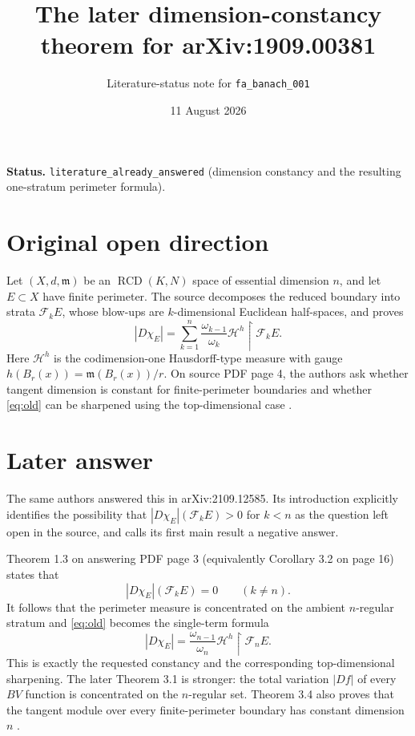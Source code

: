 \documentclass[11pt]{article}
\title{The later dimension-constancy theorem for arXiv:1909.00381}
\author{Literature-status note for \texttt{fa\_banach\_001}}
\date{11 August 2026}
\begin{document}
\maketitle

\noindent\textbf{Status.}
\texttt{literature\_already\_answered} (dimension constancy and the resulting
one-stratum perimeter formula).

\section*{Original open direction}

Let $(X,d,\mathfrak m)$ be an $\operatorname{RCD}(K,N)$ space of essential
dimension $n$, and let $E\subset X$ have finite perimeter.  The source
decomposes the reduced boundary into strata $\mathcal F_kE$, whose blow-ups
are $k$-dimensional Euclidean half-spaces, and proves
\begin{equation}\label{eq:old}
 |D\chi_E|=\sum_{k=1}^{n}\frac{\omega_{k-1}}{\omega_k}
  \mathcal H^h\!\restriction\mathcal F_kE.
\end{equation}
Here $\mathcal H^h$ is the codimension-one Hausdorff-type measure with gauge
$h(B_r(x))=\mathfrak m(B_r(x))/r$.  On source PDF page 4, the authors ask
whether tangent dimension is constant for finite-perimeter boundaries and
whether \eqref{eq:old} can be sharpened using the top-dimensional case
\cite{BPS19}.

\section*{Later answer}

The same authors answered this in arXiv:2109.12585.  Its introduction
explicitly identifies the possibility that
$|D\chi_E|(\mathcal F_kE)>0$ for $k<n$ as the question left open in the
source, and calls its first main result a negative answer.

Theorem 1.3 on answering PDF page 3 (equivalently Corollary 3.2 on page 16)
states that
\begin{equation}\label{eq:constant}
 |D\chi_E|(\mathcal F_kE)=0\qquad(k\ne n).
\end{equation}
It follows that the perimeter measure is concentrated on the ambient
$n$-regular stratum and \eqref{eq:old} becomes the single-term formula
\begin{equation}\label{eq:new}
 |D\chi_E|=\frac{\omega_{n-1}}{\omega_n}
  \mathcal H^h\!\restriction\mathcal F_nE.
\end{equation}
This is exactly the requested constancy and the corresponding
top-dimensional sharpening.  The later Theorem 3.1 is stronger: the total
variation $|Df|$ of every $BV$ function is concentrated on the $n$-regular
set.  Theorem 3.4 also proves that the tangent module over every
finite-perimeter boundary has constant dimension $n$ \cite{BPS21}.
\end{document}
